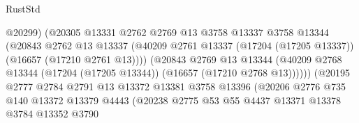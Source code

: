 \begin{lexlean}{RustStd}
\begin{coremodule}
                                        @20299)
                                      (@20305
                                        @13331
                                        @2762
                                        @2769
                                        @13
                                        @3758
                                        @13337
                                        @3758
                                        @13344
                                        (@20843
                                          @2762
                                          @13
                                          @13337
                                          (@40209
                                            @2761
                                            @13337
                                            (@17204 (@17205 @13337))
                                            (@16657 (@17210 @2761 @13))))
                                        (@20843
                                          @2769
                                          @13
                                          @13344
                                          (@40209
                                            @2768
                                            @13344
                                            (@17204 (@17205 @13344))
                                            (@16657 (@17210 @2768 @13))))))
                                    (@20195
                                      @2777
                                      @2784
                                      @2791
                                      @13
                                      @13372
                                      @13381
                                      @3758
                                      @13396
                                      (@20206
                                        @2776
                                        @735
                                        @140
                                        @13372
                                        @13379
                                        @4443
                                        (@20238
                                          @2775
                                          @53
                                          @55
                                          @4437
                                          @13371
                                          @13378
                                          @3784
                                          @13352
                                          @3790

\end{coremodule}
\end{lexlean}
